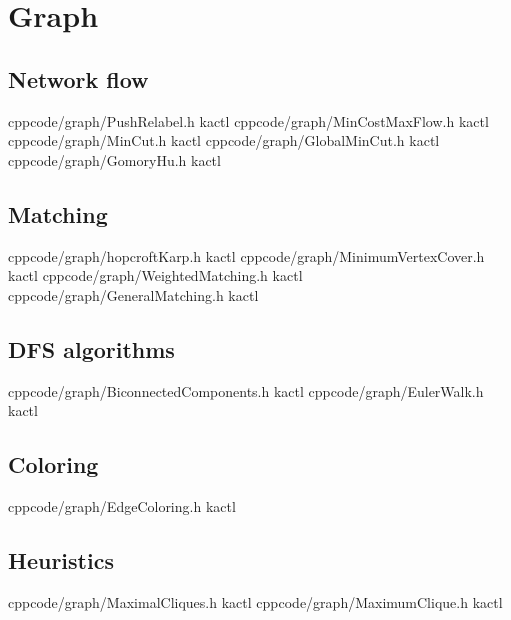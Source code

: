 \chapter{Graph}

\section{Network flow}
    {}{}
    {cpp}{code/graph/PushRelabel.h}
    {kactl}
    {}{}
    {cpp}{code/graph/MinCostMaxFlow.h}
    {kactl}
    {}{}
    {cpp}{code/graph/MinCut.h}
    {kactl}
    {}{}
    {cpp}{code/graph/GlobalMinCut.h}
    {kactl}
    {}{}
    {cpp}{code/graph/GomoryHu.h}
    {kactl}

\section{Matching}
    {}{}
    {cpp}{code/graph/hopcroftKarp.h}
    {kactl}
    {}{}
    {cpp}{code/graph/MinimumVertexCover.h}
    {kactl}
    {}{}
    {cpp}{code/graph/WeightedMatching.h}
    {kactl}
    {}{}
    {cpp}{code/graph/GeneralMatching.h}
    {kactl}

\section{DFS algorithms}
    {}{}
    {cpp}{code/graph/BiconnectedComponents.h}
    {kactl}
    {}{}
    {cpp}{code/graph/EulerWalk.h}
    {kactl}

\section{Coloring}
    {}{}
    {cpp}{code/graph/EdgeColoring.h}
    {kactl}

\section{Heuristics}
    {}{}
    {cpp}{code/graph/MaximalCliques.h}
    {kactl}
    {}{}
    {cpp}{code/graph/MaximumClique.h}
    {kactl}

